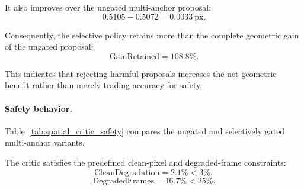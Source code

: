 \documentclass[11pt,a4paper]{article}
\begin{document}
It also improves over the ungated multi-anchor proposal:
\begin{equation}
    0.5105-0.5072
    =
    0.0033\ \mathrm{px}.
\end{equation}

Consequently, the selective policy retains more than the complete geometric
gain of the ungated proposal:
\begin{equation}
    \mathrm{GainRetained}
    =
    108.8\%.
\end{equation}

This indicates that rejecting harmful proposals increases the net geometric
benefit rather than merely trading accuracy for safety.

\paragraph{Safety behavior.}

Table~\ref{tab:spatial_critic_safety} compares the ungated and selectively
gated multi-anchor variants.

\begin{table}[t]
    \centering
    \caption{Safety and intervention behavior on frozen dataset 7.}
    \label{tab:spatial_critic_safety}
\end{table}

The critic satisfies the predefined clean-pixel and degraded-frame constraints:
\begin{equation}
    \mathrm{CleanDegradation}=2.1\% < 3\%,
\end{equation}
\begin{equation}
    \mathrm{DegradedFrames}=16.7\% < 25\%.
\end{equation}
\end{document}

